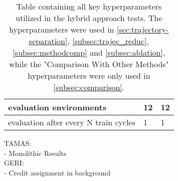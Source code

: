 \begin{table}[H]
\begin{tabularx}{\textwidth}{|X|C{3.8cm}|C{3.8cm}|}
        \hline
        evaluation environments & 12 & 12 \\
        \hline
        evaluation after every N train cycles & 1 & 1 \\
        \hline
    \end{tabularx}
    \captionsetup{justification=justified, singlelinecheck=false, width=1\linewidth, labelfont=bf} 
    \caption{Table containing all key hyperparameters utilized in the hybrid approach tests. The  hyperparameters were used in \autoref{sec:trajectory-separation}, \autoref{subsec:trajec_reduc}, \autoref{subsec:methodcomp} and \autoref{subsec:ablation}, while  the "Comparison With Other Methods" hyperparameters were only used in \autoref{subsec:comparison}.}
    \label{tab:hybrid-approach-hyperparameters}
\end{table}


\noindent TAMAS: \\
- Monolithic Results \\


\noindent GERI: \\
- Credit assignment in background \\
